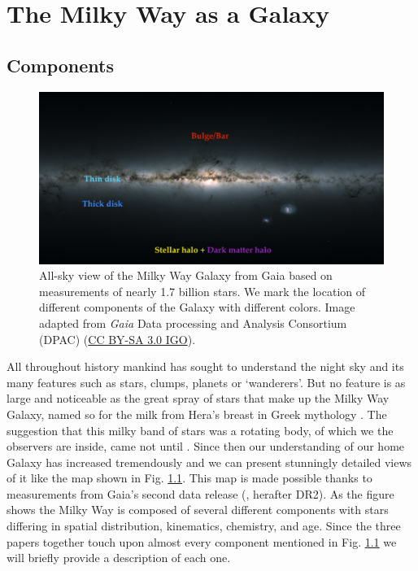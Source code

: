 \chapter{The Milky Way as a Galaxy}\label{chap:milkyway}
\section{Components}\label{sec:components}
\begin{figure}[t]
    \centering
    \includegraphics[width=1\textwidth]{images/gaiasky.png}
    \caption{All-sky view of the Milky Way Galaxy from Gaia based on measurements of nearly 1.7 billion stars. We mark the location of different components of the Galaxy with different colors. Image adapted from \textit{Gaia} Data processing and Analysis Consortium (DPAC) (\href{https://creativecommons.org/licenses/by-sa/3.0/}{CC BY-SA 3.0 IGO}).} %
    \label{fig:gaiasky}
\end{figure}
All throughout history mankind has sought to understand the night sky and its many features such as stars, clumps, planets or `wanderers'. But no feature is as large and noticeable as the great spray of stars that make up the Milky Way Galaxy, named so for the milk from Hera's breast in Greek mythology \citep{leeming:98}. The suggestion that this milky band of stars was a rotating body, of which we the observers are inside, came not until \cite{wright:1750}. Since then our understanding of our home Galaxy has increased tremendously and we can present stunningly detailed views of it like the map shown in Fig. \ref{fig:gaiasky}. This map is made possible thanks to measurements from Gaia's second data release (\citealt{dr2},  herafter DR2). As the figure shows the Milky Way is composed of several different components with stars differing in spatial distribution, kinematics, chemistry, and age. Since the three papers together touch upon almost every component mentioned in Fig. \ref{fig:gaiasky} we will briefly provide a description of each one.

